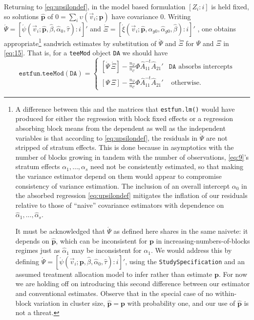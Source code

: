 \documentclass{article}
\newcommand{\absorbInterceptsEF}{\upsilon}
\begin{document}
Returning to \eqref{eq:upsilondef}, in the model based formulation $[Z_{i}: i]$ is held fixed, so
solutions $\hat{\mathbf{p}}$ of
$0 = \sum_{i}\absorbInterceptsEF(\vec{v}_{i}; \mathbf{p})$ have
covariance 0.  Writing $\acute{\Psi} =
[\acute{\psi}(\vec{v}_{i}; \hat{\mathbf{p}}, \hat{\beta},  \hat{\alpha}_{0}, \hat{\tau}) : i]'$ and $\acute{\Xi} = [\acute{\xi}(\vec{v}_{i}; \hat{\mathbf{p}}, \hat{\alpha}_{y0}, \hat{\alpha}_{g0}, \hat\beta) :i]'$ , one
obtains appropriate\footnote{%
A difference between this and the matrices that \texttt{estfun.lm()}
would have produced for either the regression with block fixed effects
or a regression absorbing block means from the dependent as well as
the independent variables is that according to \eqref{eq:upsilondef},
the residuals in $\acute{\Psi}$ are not stripped of stratum
effects.  This is done because in asymptotics with the number of
blocks growing in tandem with the number of observations,
\eqref{eq:9}'s stratum
effects $\alpha_{1}, \ldots, \alpha_{s}$ need not be consistently
estimated, so that making the variance estimator depend on them would
appear to compromise consistency of variance estimation.  The
inclusion of an overall intercept $\alpha_{0}$ in the absorbed regression
\eqref{eq:upsilondef} mitigates the inflation of our
residuals relative to those of ``naive'' covariance estimators
with dependence on $\hat{\alpha}_{1}, \ldots, \hat{\alpha}_{s}$.

It must be acknowledged that $\acute{\Psi}$ as defined here shares
in the same naivete: it depends on $\hat{\mathbf{p}}$, which can be
inconsistent for ${\mathbf{p}}$ in increasing-numbers-of-blocks
regimes just as $\hat{\alpha}_{1}$ may be inconsistent for $\alpha_{1}$. We
would address this by defining $\acute{\Psi} =
[\acute{\psi}(\vec{v}_{i}; {\mathbf{p}}, \hat{\beta},
\hat{\alpha}_{0}, \hat{\tau}) : i]'$, using
the \texttt{StudySpecification} and an assumed treatment allocation
model to infer rather than estimate $\mathbf{p}$.  For now we are
holding off on introducing this second difference between our
estimator and conventional estimates.  Observe that in the special
case of no within-block variation in cluster size, $\hat{\mathbf{p}} =
\mathbf{p}$ with probability one, and our use of $\hat{\mathbf{p}}$ is
not a threat.\label{fn:p-est-vs-inf}}
  sandwich estimates by substitution of $\acute{\Psi}$ and $\acute{\Xi}$ for
$\Psi$ and $\Xi$ in \eqref{eq:15}.  That is, for a
\texttt{teeMod} object \texttt{DA} we should have
\begin{equation*}\label{eq:26}
\mathtt{estfun.teeMod(DA)} =
  \begin{cases}
  [\acute{\Psi}\, \acute{\Xi}] -
  \frac{n_{\mathcal{Q}}}{n_{\mathcal{C}}}\Phi
  \hat{A}_{11}^{-t}\hat{A}_{21}'& \mathtt{DA} \text{ absorbs
    intercepts}\\
 [{\Psi}\, {\Xi}] - 
  \frac{n_{\mathcal{Q}}}{n_{\mathcal{C}}}\Phi
  \hat{A}_{11}^{-t}\hat{A}_{21}'  & \text{ otherwise}.
\end{cases}
\end{equation*}
\end{document}
